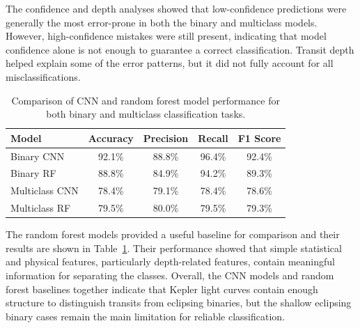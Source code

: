 The confidence and depth analyses showed that low-confidence predictions were generally the most error-prone in both the binary and multiclass models. However, high-confidence mistakes were still present, indicating that model confidence alone is not enough to guarantee a correct classification. Transit depth helped explain some of the error patterns, but it did not fully account for all misclassifications.

\begin{table}[H]
    \centering

    \begin{tabular}{lcccc}
        \hline
        \textbf{Model} & \textbf{Accuracy} & \textbf{Precision} & \textbf{Recall} & \textbf{F1 Score} \\
        \hline
        Binary CNN     & 92.1\% & 88.8\% & 96.4\% & 92.4\% \\
        Binary RF      & 88.8\% & 84.9\% & 94.2\% & 89.3\% \\
        Multiclass CNN & 78.4\% & 79.1\% & 78.4\% & 78.6\% \\
        Multiclass RF  & 79.5\% & 80.0\% & 79.5\% & 79.3\% \\
        \hline
    \end{tabular}

    \caption{Comparison of CNN and random forest model performance for both binary and multiclass classification tasks.}
    \label{tab:model_comparison}
\end{table}

The random forest models provided a useful baseline for comparison and their results are shown in Table~\ref{tab:model_comparison}. Their performance showed that simple statistical and physical features, particularly depth-related features, contain meaningful information for separating the classes. Overall, the CNN models and random forest baselines together indicate that Kepler light curves contain enough structure to distinguish transits from eclipsing binaries, but the shallow eclipsing binary cases remain the main limitation for reliable classification.

